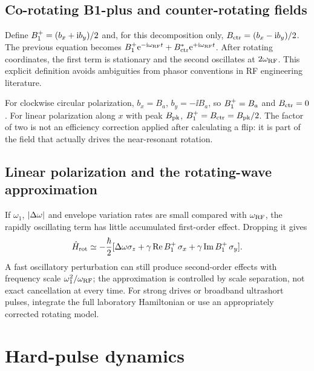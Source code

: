 \subsection{Co-rotating B1-plus and counter-rotating fields}
Define $B_{1}^{+}=(b_x+\mathrm{i} b_y)/2$ and, for this decomposition only,
$B_{\rm ctr}=(b_x-\mathrm{i} b_y)/2$.
The previous equation becomes
$B_{1}^{+}\mathrm{e}^{-\mathrm{i}\omega_{\rm RF}t}+B_{\rm ctr}^*
\mathrm{e}^{+\mathrm{i}\omega_{\rm RF}t}$.
After rotating coordinates, the first term is stationary and the second
oscillates at $2\omega_{\rm RF}$.
This explicit definition avoids ambiguities from phasor conventions in
RF engineering literature.

For clockwise circular polarization,
$b_x=B_a$, $b_y=-\ii B_a$, so $B_{1}^{+}=B_a$ and $B_{\rm ctr}=0$.
For linear polarization along $x$ with peak $B_{\rm pk}$,
$B_{1}^{+}=B_{\rm ctr}=B_{\rm pk}/2$.
The factor of two is not an efficiency correction applied after
calculating a flip: it is part of the field that actually drives the
near-resonant rotation.

\subsection{Linear polarization and the rotating-wave approximation}
If $\omega_1$, $\lvert\Delta\omega\rvert$ and envelope variation rates are
small compared with $\omega_{\rm RF}$, the rapidly oscillating term has
little accumulated first-order effect. Dropping it gives
\[
 \hat{H}_{\rm rot}\simeq-\frac{\hbar}{2}
 [\Delta\omega\sigma_z+\gamma\operatorname{Re}B_{1}^{+}\,\sigma_x+
                              \gamma\operatorname{Im}B_{1}^{+}\,\sigma_y].
\]
A fast oscillatory perturbation can still produce second-order effects
with frequency scale $\omega_1^2/\omega_{\rm RF}$; the approximation
is controlled by scale separation, not exact cancellation at every time.
For strong drives or broadband ultrashort pulses, integrate the full
laboratory Hamiltonian or use an appropriately corrected rotating model.

\section{Hard-pulse dynamics}
\label{sec:04:hard-pulse-dynamics}
